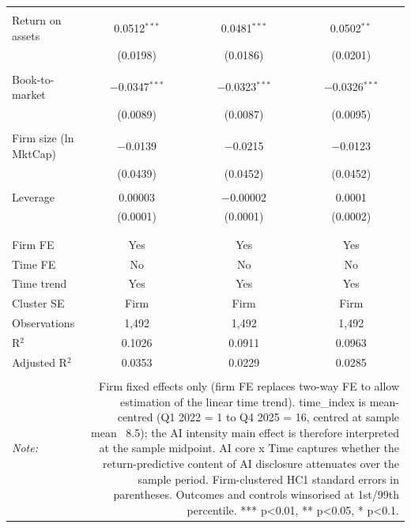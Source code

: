 \begin{table}[!htbp]
\begin{tabular}{@{\extracolsep{5pt}}lccc}
  & & & \\ 
 Return on assets & 0.0512$^{***}$ & 0.0481$^{***}$ & 0.0502$^{**}$ \\ 
  & (0.0198) & (0.0186) & (0.0201) \\ 
  & & & \\ 
 Book-to-market & $-$0.0347$^{***}$ & $-$0.0323$^{***}$ & $-$0.0326$^{***}$ \\ 
  & (0.0089) & (0.0087) & (0.0095) \\ 
  & & & \\ 
 Firm size (ln MktCap) & $-$0.0139 & $-$0.0215 & $-$0.0123 \\ 
  & (0.0439) & (0.0452) & (0.0452) \\ 
  & & & \\ 
 Leverage & 0.00003 & $-$0.00002 & 0.0001 \\ 
  & (0.0001) & (0.0001) & (0.0002) \\ 
  & & & \\ 
\hline \\[-1.8ex] 
Firm FE & Yes & Yes & Yes \\ 
Time FE & No & No & No \\ 
Time trend & Yes & Yes & Yes \\ 
Cluster SE & Firm & Firm & Firm \\ 
Observations & 1,492 & 1,492 & 1,492 \\ 
R$^{2}$ & 0.1026 & 0.0911 & 0.0963 \\ 
Adjusted R$^{2}$ & 0.0353 & 0.0229 & 0.0285 \\ 
\hline 
\hline \\[-1.8ex] 
\textit{Note:}  & \multicolumn{3}{r}{Firm fixed effects only (firm FE replaces two-way FE to allow estimation of the linear time trend). time_index is mean-centred (Q1 2022 = 1 to Q4 2025 = 16, centred at sample mean ~8.5); the AI intensity main effect is therefore interpreted at the sample midpoint. AI core x Time captures whether the return-predictive content of AI disclosure attenuates over the sample period. Firm-clustered HC1 standard errors in parentheses. Outcomes and controls winsorised at 1st/99th percentile. *** p<0.01, ** p<0.05, * p<0.1.} \\ 
\end{tabular} 
\end{table} 
